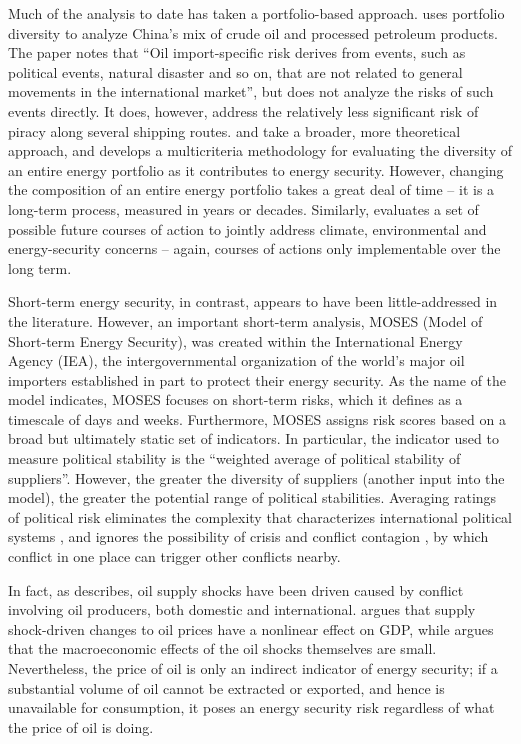 \documentclass{article}
\begin{document}
Much of the analysis to date has taken a portfolio-based approach. \citet{wu_2009} uses portfolio diversity to analyze China's mix of crude oil and processed petroleum products. The paper notes that ``Oil import-specific risk derives from events, such as political events, natural disaster and so on, that are not related to general movements in the international market'', but does not analyze the risks of such events directly. It does, however, address the relatively less significant risk of piracy along several shipping routes. \citet{stirling_2010} and \citet{skea_2010} take a broader, more theoretical approach, and develops a multicriteria methodology for evaluating the diversity of an entire energy portfolio as it contributes to energy security. However, changing the composition of an entire energy portfolio takes a great deal of time -- it is a long-term process, measured in years or decades. Similarly, \citet{jacobson_2009} evaluates a set of possible future courses of action to jointly address climate, environmental and energy-security concerns -- again, courses of actions only implementable over the long term.

Short-term energy security, in contrast, appears to have been little-addressed in the literature. However, an important short-term analysis, MOSES (Model of Short-term Energy Security), was created within the International Energy Agency (IEA), the intergovernmental organization of the world's major oil importers established in part to protect their energy security. As the name of the model indicates, MOSES focuses on short-term risks, which it defines as a timescale of days and weeks. Furthermore, MOSES assigns risk scores based on a broad but ultimately static set of indicators. In particular, the indicator used to measure political stability is the ``weighted average of political stability of suppliers''. However, the greater the diversity of suppliers (another input into the model), the greater the potential range of political stabilities. Averaging ratings of political risk eliminates the complexity that characterizes international political systems \citep{cederman_1997,geller_2011}, and ignores the possibility of crisis and conflict contagion \citep{black_2013}, by which conflict in one place can trigger other conflicts nearby. 

In fact, as \citet{hamilton_2003} describes, oil supply shocks have been driven caused by conflict involving oil producers, both domestic and international. \citet{hamilton_2003} argues that supply shock-driven changes to oil prices have a nonlinear effect on GDP, while \citet{kilian_2008} argues that the macroeconomic effects of the oil shocks themselves are small. Nevertheless, the price of oil is only an indirect indicator of energy security; if a substantial volume of oil cannot be extracted or exported, and hence is unavailable for consumption, it poses an energy security risk regardless of what the price of oil is doing. 
\end{document}
